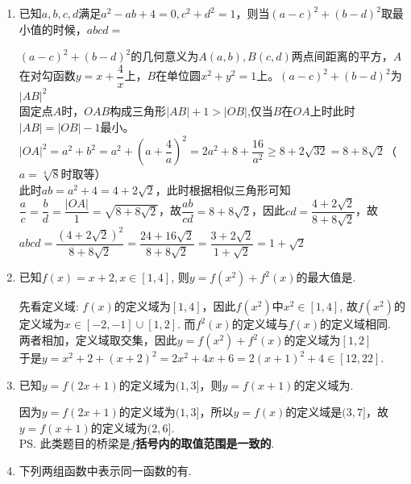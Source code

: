 \begin{enumerate}
\begin{enumerate}
\begin{jieda}
        \end{jieda}
    \end{enumerate}
    \item 已知$a,b,c,d$满足$a^2-ab+4 = 0, c^2+d^2 = 1$，则当$(a-c)^2 + (b-d)^2$取最小值的时候，$abcd = $
    \begin{jieda}
        $(a-c)^2 + (b-d)^2$的几何意义为$A(a, b), B(c,d)$两点间距离的平方，$A$在对勾函数$y = x + \dfrac{4}{x}$上，$B$在单位圆$x^2+y^2 = 1$上。$(a-c)^2 + (b-d)^2$为$|AB|^2$ \\
        固定点$A$时，$OAB$构成三角形$|AB| + 1 > |OB|$,仅当$B$在$OA$上时此时$|AB| = |OB| - 1$最小。 \\
        $|OA|^2 = a^2 + b^2 = a^2 + (a + \dfrac{4}{a})^2 = 2a^2 + 8 + \dfrac{16}{a^2} \geq 8 + 2\sqrt{32} = 8 + 8\sqrt{2}$（$a = \sqrt[4]{8}$时取等）\\
        此时$ab = a^2+4 = 4 + 2\sqrt{2}$，此时根据相似三角形可知$\dfrac{a}{c} = \dfrac{b}{d} = \dfrac{|OA|}{1} = \sqrt{8 + 8\sqrt{2}}$，故$\dfrac{ab}{cd} = 8 + 8\sqrt{2}$，因此$cd = \dfrac{4 + 2\sqrt{2}}{8+8\sqrt{2}}$，故$abcd = \dfrac{(4 + 2\sqrt{2})^2}{8+8\sqrt{2}} = \dfrac{24 + 16\sqrt{2}}{8+8\sqrt{2}} = \dfrac{3+2\sqrt{2}}{1+\sqrt{2}} = 1+\sqrt{2}$
    \end{jieda}
    \item 已知$f(x)=x+2, x\in[1,4]$, 则$y=f(x^2)+f^2(x)$的最大值是. 
    \begin{jieda}
    先看定义域: $f(x)$的定义域为$[1,4]$，因此$f(x^2)$中$x^2\in[1,4]$, 故$f(x^2)$的定义域为$x\in[-2,-1] \cup [1,2]$. 而$f^2(x)$的定义域与$f(x)$的定义域相同.\\
    两者相加，定义域取交集，因此$y=f(x^2)+f^2(x)$的定义域为$[1, 2]$ \\
    于是$y=x^2+2+(x+2)^2=2x^2+4x+6=2(x+1)^2+4\in[12,22]$.
    \end{jieda}
    \item 已知$y = f(2x+1)$的定义域为$(1, 3]$，则$y = f(x+1)$的定义域为\blkda{$(2, 6]$}. 
    \begin{jieda}
        因为$y = f(2x+1)$的定义域为$(1, 3]$，所以$y = f(x)$的定义域是$(3,7]$，故$y = f(x+1)$的定义域为$(2, 6]$. \\
        \ps 此类题目的桥梁是\textbf{$f$括号内的取值范围是一致的}.
    \end{jieda}
    \item 下列两组函数中表示同一函数的有. \\
\end{enumerate}
